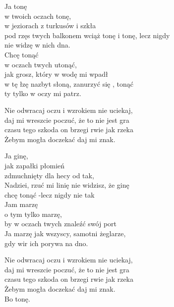 \begin{text}
    \hfill\break
    Ja tonę\\
    w twoich oczach tonę,\\
    w jeziorach z turkusów i szkła\\
    pod rzęs twych balkonem wciąż tonę i tonę, lecz nigdy\\
    nie widzę w nich dna.\\
    Chcę tonąć\\
    w oczach twych utonąć,\\
    jak grosz, który w wodę mi wpadł\\
    w tę łzę nazbyt słoną, zanurzyć się , tonąć\\
    ty tylko w oczy mi patrz.

    Nie odwracaj oczu i wzrokiem nie uciekaj,\\
    daj mi wreszcie poczuć, że to nie jest gra\\
    czasu tego szkoda on brzegi rwie jak rzeka\\
    Żebym mogła doczekać daj mi znak.

    Ja ginę,\\
    jak zapałki płomień\\
    zdmuchnięty dla hecy od tak,\\
    Nadziei, rzuć mi linię nie widzisz, że ginę\\
    chcę tonąć -lecz nigdy nie tak\\
    Jam marzę\\
    o tym tylko marzę,\\
    by w oczach twych znaleźć swój port\\
    Ja marzę jak wszyscy, samotni żeglarze,\\
    gdy wir ich porywa na dno.

    Nie odwracaj oczu i wzrokiem nie uciekaj,\\
    daj mi wreszcie poczuć, że to nie jest gra\\
    czasu tego szkoda on brzegi rwie jak rzeka\\
    Żebym mogła doczekać daj mi znak.\\
    Bo tonę.
\end{text}
